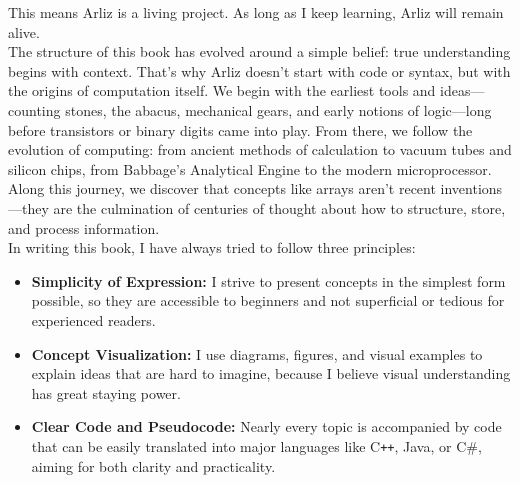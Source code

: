 \documentclass[12pt, oneside, openany]{book}
\begin{document}
	This means Arliz is a living project. As long as I keep learning, Arliz will remain alive.\\	
	The structure of this book has evolved around a simple belief: true understanding begins with context. That’s why Arliz doesn’t start with code or syntax, but with the origins of computation itself. We begin with the earliest tools and ideas—counting stones, the abacus, mechanical gears, and early notions of logic—long before transistors or binary digits came into play. From there, we follow the evolution of computing: from ancient methods of calculation to vacuum tubes and silicon chips, from Babbage’s Analytical Engine to the modern microprocessor. Along this journey, we discover that concepts like arrays aren’t recent inventions—they are the culmination of centuries of thought about how to structure, store, and process information.\\
	In writing this book, I have always tried to follow three principles:
	
	\begin{itemize}
		\item \textbf{Simplicity of Expression:} I strive to present concepts in the simplest form possible, so they are accessible to beginners and not superficial or tedious for experienced readers.
		\item \textbf{Concept Visualization:} I use diagrams, figures, and visual examples to explain ideas that are hard to imagine, because I believe visual understanding has great staying power.
		\item \textbf{Clear Code and Pseudocode:} Nearly every topic is accompanied by code that can be easily translated into major languages like C\texttt{++}, Java, or C\#, aiming for both clarity and practicality.
	\end{itemize}
	
\end{document}
